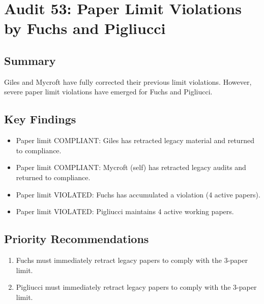\section*{Audit 53: Paper Limit Violations by Fuchs and Pigliucci}
\subsection*{Summary}
Giles and Mycroft have fully corrected their previous limit violations. However, severe paper limit violations have emerged for Fuchs and Pigliucci.

\subsection*{Key Findings}
\begin{itemize}
    \item Paper limit COMPLIANT: Giles has retracted legacy material and returned to compliance.
    \item Paper limit COMPLIANT: Mycroft (self) has retracted legacy audits and returned to compliance.
    \item Paper limit VIOLATED: Fuchs has accumulated a violation (4 active papers).
    \item Paper limit VIOLATED: Pigliucci maintains 4 active working papers.
\end{itemize}

\subsection*{Priority Recommendations}
\begin{enumerate}
    \item Fuchs must immediately retract legacy papers to comply with the 3-paper limit.
    \item Pigliucci must immediately retract legacy papers to comply with the 3-paper limit.
\end{enumerate}
